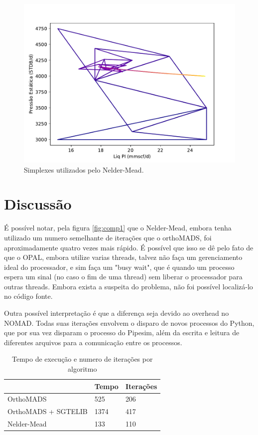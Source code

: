 \begin{figure}
\centering
	  \includegraphics[width=0.7\linewidth]{figs/triangles_neldermead.pdf}
  \caption{Simplexes utilizados pelo Nelder-Mead.}
  \label{fig:setup3_triang}
\end{figure}




\section{Discussão}

É possível notar, pela figura \ref{fig:comp1} que o Nelder-Mead, embora tenha utilizado um numero semelhante de iterações que o orthoMADS, foi aproximadamente quatro vezes mais rápido. É possível que isso se dê pelo fato de que o OPAL, embora utilize varias threads, talvez não faça um gerenciamento ideal do processador, e sim faça um "busy wait", que é quando um processo espera um sinal (no caso o fim de uma thread) sem liberar o processador para outras threads. Embora exista a suspeita do problema, não foi possível localizá-lo no código fonte.

Outra possível interpretação é que a diferença seja devido ao overhead no NOMAD. Todas suas iterações envolvem o disparo de novos processos do Python, que por sua vez disparam o processo do Pipesim, além da escrita e leitura de diferentes arquivos para a comunicação entre os processos.


\begin{table}[]
\centering
\caption{Tempo de execução e numero de iterações por algoritmo}
\label{my-label}
\begin{tabular}{|l|l|l|}
\hline
                    & Tempo & Iterações \\ \hline
OrthoMADS           & 525   & 206       \\ \hline
OrthoMADS + SGTELIB & 1374  & 417       \\ \hline
Nelder-Mead         & 133   & 110        \\ \hline
\end{tabular}
\end{table}


